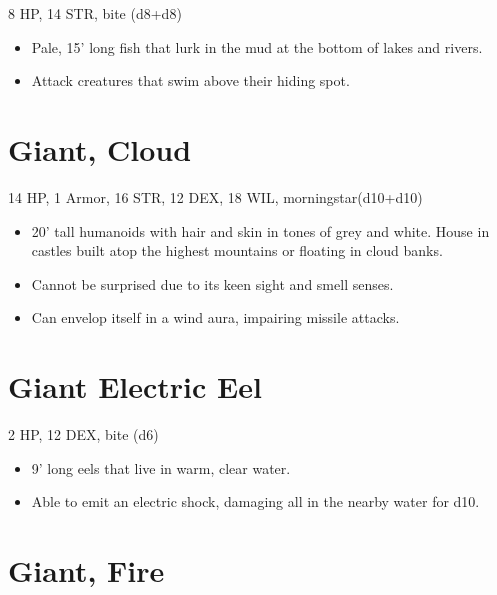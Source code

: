 \documentclass[
  10pt,
  american,
]{article}
\begin{document}
8 HP, 14 STR, bite (d8+d8)

\begin{samepage}
\begin{itemize}
\setlength\itemsep{-.5em}
\item Pale, 15’ long fish that lurk in the mud at the bottom of lakes and rivers.
\item Attack creatures that swim above their hiding spot.
\end{itemize}
\end{samepage}

\hypertarget{giant-cloud}{%
\section{Giant, Cloud}\label{giant-cloud}}

14 HP, 1 Armor, 16 STR, 12 DEX, 18 WIL, morningstar(d10+d10)

\begin{samepage}
\begin{itemize}
\setlength\itemsep{-.5em}
\item 20’ tall humanoids with hair and skin in tones of grey and white. House in castles built atop the highest mountains or floating in cloud banks.
\item Cannot be surprised due to its keen sight and smell senses.
\item Can envelop itself in a wind aura, impairing missile attacks.
\end{itemize}
\end{samepage}

\hypertarget{giant-electric-eel}{%
\section{Giant Electric Eel}\label{giant-electric-eel}}

2 HP, 12 DEX, bite (d6)

\begin{samepage}
\begin{itemize}
\setlength\itemsep{-.5em}
\item 9’ long eels that live in warm, clear water.
\item Able to emit an electric shock, damaging all in the nearby water for d10.
\end{itemize}
\end{samepage}

\hypertarget{giant-fire}{%
\section{Giant, Fire}\label{giant-fire}}
\end{document}
